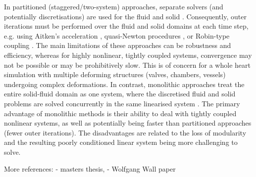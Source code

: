 \documentclass[sn-mathphys,Numbered]{sn-jnl}%
\begin{document}
In partitioned (staggered/two-system) approaches, separate solvers (and potentially discretisations) are used for the fluid and solid \citep{tukovic2018openfoam}. Consequently, outer iterations must be performed over the fluid and solid domains at each time step, e.g. using Aitken’s acceleration \citep{degroote2009performance, bungartz2016precice, irons1969version, kuttler2008fixed}, quasi-Newton procedures \citep{santiago2020hpc, delaisse2022surrogate}, or Robin-type coupling \citep{tukovic2019added}. The main limitations of these approaches can be robustness and efficiency, whereas for highly nonlinear, tightly coupled systems, convergence may not be possible or may be prohibitively slow. This is of concern for a whole heart simulation with multiple deforming structures (valves, chambers, vessels) undergoing complex deformations. In contrast, monolithic approaches treat the entire solid-fluid domain as one system, where the discretised fluid and solid problems are solved concurrently in the same linearised system \citep{degroote2009performance}. The primary advantage of monolithic methods is their ability to deal with tightly coupled nonlinear systems, as well as potentially being faster than partitioned approaches (fewer outer iterations). The disadvantages are related to the loss of modularity and the resulting poorly conditioned linear system being more challenging to solve.

More references:
- \citet{Gjertsen2017} masters thesis, \citep{Sebastian-Gjertsen-turtleFSI}
- Wolfgang Wall paper


\end{document}
